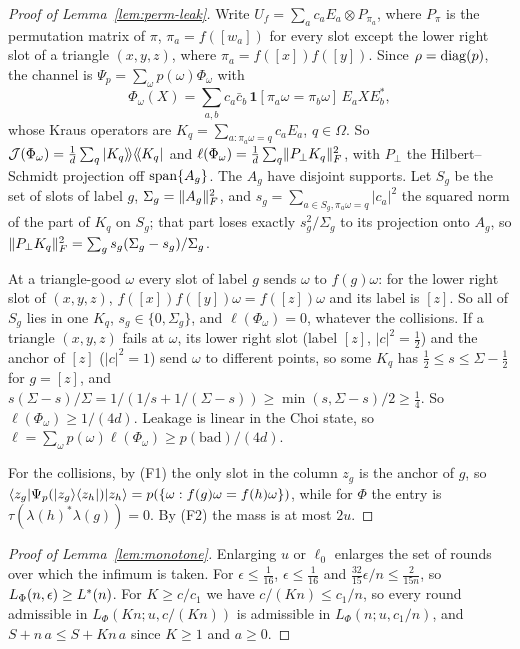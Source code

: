 \begin{proof}[Proof of Lemma~\ref{lem:perm-leak}]
Write $U_f=\sum_ac_aE_a\otimes P_{\pi_a}$, where $P_\pi$ is the permutation matrix of $\pi$, $\pi_a=f([w_a])$ for every slot except the lower right
slot of a triangle $(x,y,z)$, where $\pi_a=f([x])f([y])$. Since $\rho=\operatorname{diag}(p)$, the channel is $\Psi_p=\sum_\omega p(\omega)\Phi_\omega$ with
\[
\Phi_\omega(X)=\sum_{a,b}c_a\bar c_b\,\mathbf 1[\pi_a\omega=\pi_b\omega]\,E_aXE_b^*,
\]
whose Kraus operators are $K_q=\sum_{a:\pi_a\omega=q}c_aE_a$, $q\in\Omega$. So $\mathcal J(\Phi_\omega)=\frac1d\sum_q\vert K_q\rangle\!\rangle\langle\!\langle K_q\vert$ and
$\ell(\Phi_\omega)=\frac1d\sum_q\lVert P_\perp K_q\rVert_F^2$, with $P_\perp$ the Hilbert--Schmidt projection off $\operatorname{span}\{A_g\}$. The $A_g$ have disjoint supports.
Let $S_g$ be the set of slots of label $g$, $\Sigma_g=\lVert A_g\rVert_F^2$, and $s_g=\sum_{a\in S_g,\pi_a\omega=q}|c_a|^2$ the squared norm of the part of
$K_q$ on $S_g$; that part loses exactly $s_g^2/\Sigma_g$ to its projection onto $A_g$, so $\lVert P_\perp K_q\rVert_F^2=\sum_gs_g(\Sigma_g-s_g)/\Sigma_g$.

At a triangle-good $\omega$ every slot of label $g$ sends $\omega$ to $f(g)\omega$: for the lower right slot of $(x,y,z)$,
$f([x])f([y])\omega=f([z])\omega$ and its label is $[z]$. So all of $S_g$ lies in one $K_q$, $s_g\in\{0,\Sigma_g\}$, and $\ell(\Phi_\omega)=0$, whatever the
collisions. If a triangle $(x,y,z)$ fails at $\omega$, its lower right slot (label $[z]$, $|c|^2=\frac12$) and the anchor of $[z]$ ($|c|^2=1$) send $\omega$
to different points, so some $K_q$ has $\frac12\le s\le\Sigma-\frac12$ for $g=[z]$, and $s(\Sigma-s)/\Sigma=1/(1/s+1/(\Sigma-s))\ge\min(s,\Sigma-s)/2\ge\frac14$.
So $\ell(\Phi_\omega)\ge1/(4d)$. Leakage is linear in the Choi state, so $\ell=\sum_\omega p(\omega)\ell(\Phi_\omega)\ge p(\mathrm{bad})/(4d)$.

For the collisions, by (F1) the only slot in the column $z_g$ is the anchor of $g$, so
$\langle z_g\rvert\Psi_p(\lvert z_g\rangle\langle z_h\rvert)\lvert z_h\rangle=p(\{\omega:f(g)\omega=f(h)\omega\})$, while for $\Phi$ the entry is $\tau(\lambda(h)^*\lambda(g))=0$. By (F2) the
mass is at most $2u$.
\end{proof}

\begin{proof}[Proof of Lemma~\ref{lem:monotone}]
Enlarging $u$ or $\ell_0$ enlarges the set of rounds over which the infimum is taken. For $\epsilon\le\frac1{16}$, $\epsilon\le\frac1{16}$ and
$\frac{32}{15}\epsilon/n\le\frac2{15n}$, so $L_\Phi(n,\epsilon)\ge L^{*}(n)$. For $K\ge c/c_1$ we have $c/(Kn)\le c_1/n$, so every round admissible in
$L_\Phi(Kn;u,c/(Kn))$ is admissible in $L_\Phi(n;u,c_1/n)$, and $S+n\,a\le S+Kn\,a$ since $K\ge1$ and $a\ge0$.
\end{proof}


